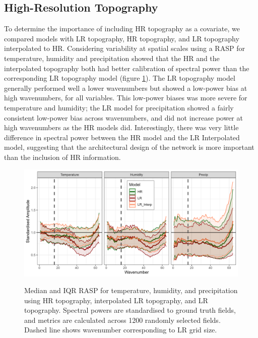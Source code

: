 \documentclass{ametsocV6.1}
\begin{document}
\subsection{High-Resolution Topography}
To determine the importance of including HR topography as a covariate, we compared models with LR topography, HR topography, and LR topography interpolated to HR. Considering variability at spatial scales using a RASP for temperature, humidity and precipitation showed that the HR and the interpolated topography both had better calibration of spectral power than the corresponding LR topography model (figure \ref{hr_topo}). The LR topography model generally performed well a lower wavenumbers but showed a low-power bias at high wavenumbers, for all variables. This low-power biases was more severe for temperature and humidity; the LR model for precipitation showed a fairly consistent low-power bias across wavenumbers, and did not increase power at high wavenumbers as the HR models did. Interestingly, there was very little difference in spectral power between the HR model and the LR Interpolated model, suggesting that the architectural design of the network is more important than the inclusion of HR information.  
\begin{figure}[H]
  \noindent\includegraphics[width=\textwidth,angle=0]{final/RASP_TopoExp.png}\\
  \caption{Median and IQR RASP for temperature,  humidity, and precipitation using HR topography, interpolated LR topography, and LR topography. Spectral powers are standardised to ground truth fields, and metrics are calculated across 1200 randomly selected fields. Dashed line shows wavenumber corresponding to LR grid size.}\label{hr_topo}
\end{figure}
\end{document}
